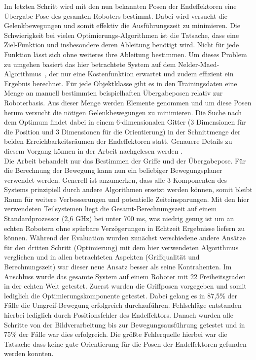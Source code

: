 Im letzten Schritt wird mit den nun bekannten Posen der Endeffektoren eine Übergabe-Pose des gesamten Roboters bestimmt. Dabei wird versucht die Gelenkbewegungen und somit effektiv die Ausführungszeit zu minimieren. Die Schwierigkeit bei vielen Optimierungs-Algorithmen ist die Tatsache, dass eine Ziel-Funktion und insbesondere deren Ableitung benötigt wird. Nicht für jede Funktion lässt sich ohne weiteres ihre Ableitung bestimmen. Um dieses Problem zu umgehen basiert das hier betrachtete System auf dem \glqq Nelder-Maed\grqq -Algorithmus~\citep{nelder1965simplex}, der nur eine Kostenfunktion erwartet und zudem effizient ein Ergebnis berechnet. Für jede Objektklasse gibt es in den Trainingsdaten eine Menge an manuell bestimmten beispielhaften Übergabeposen relativ zur Roboterbasis. Aus dieser Menge werden Elemente genommen und um diese Posen herum versucht die nötigen Gelenkbewegungen zu minimieren. Die Suche nach dem Optimum findet dabei in einem 6-dimensionalen Gitter (3 Dimensionen für die Position und 3 Dimensionen für die Orientierung) in der Schnittmenge der beiden Erreichbarkeitsräumen der Endeffektoren statt. Genauere Details zu diesem Vorgang können in der Arbeit nachgelesen werden \citep{balaguer2012bimanual}.
\\

Die Arbeit behandelt nur das Bestimmen der Griffe und der Übergabepose. Für die Berechnung der Bewegung kann nun ein beliebiger Bewegungsplaner verwendet werden. Generell ist anzumerken, dass alle 3 Komponenten des Systems prinzipiell durch andere Algorithmen ersetzt werden können, somit bleibt Raum für weitere Verbesserungen und potentielle Zeiteinsparungen. Mit den hier verwendeten Teilsystemen liegt die Gesamt-Berechnungszeit auf einem Standardprozessor (2,6 GHz) bei unter 700 ms, was niedrig genug ist um an echten Robotern ohne spürbare Verzögerungen in Echtzeit Ergebnisse liefern zu können. Während der Evaluation wurden zunächst verschiedene andere Ansätze für den dritten Schritt (\glqq Optimierung\grqq) mit dem hier verwendeten Algorithmus verglichen und in allen betrachteten Aspekten (Griffqualität und Berechnungszeit) war dieser neue Ansatz besser als seine Kontrahenten. Im Anschluss wurde das gesamte System auf einem Roboter mit 22 Freiheitsgraden in der echten Welt getestet. Zuerst wurden die Griffposen vorgegeben und somit lediglich die Optimierungskomponente getestet. Dabei gelang es in 87,5\% der Fälle die Umgreif-Bewegung erfolgreich durchzuführen. Fehlschläge entstanden hierbei lediglich durch Positionsfehler des Endeffektors. Danach wurden alle Schritte von der Bildverarbeitung bis zur Bewegungsausführung getestet und in 75\% der Fälle war dies erfolgreich. Die größte Fehlerquelle hierbei war die Tatsache dass keine gute Orientierung für die Posen der Endeffektoren gefunden werden konnten. 


